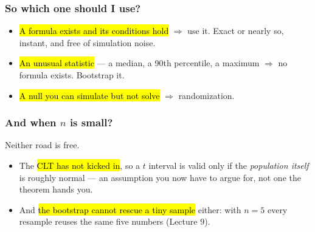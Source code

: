 \documentclass[slidestop,compress,mathserif]{beamer}
\begin{document}
\begin{frame}
\frametitle{So which one should I use?}

\begin{itemize}
\item \hl{A formula exists and its conditions hold} $\Rightarrow$ use it. Exact or nearly so, instant, and free of simulation noise.
\item \hl{An unusual statistic} --- a median, a 90th percentile, a maximum $\Rightarrow$ no formula exists. Bootstrap it.
\item \hl{A null you can simulate but not solve} $\Rightarrow$ randomization.
\end{itemize}

\vspace{0.4em}

\end{frame}

\begin{frame}
\frametitle{And when $n$ is small?}

Neither road is free.

\begin{itemize}
\item The \hl{CLT has not kicked in}, so a $t$ interval is valid only if the \emph{population itself} is roughly normal --- an assumption you now have to argue for, not one the theorem hands you.
\item And \hl{the bootstrap cannot rescue a tiny sample} either: with $n=5$ every resample reuses the same five numbers (Lecture 9).
\end{itemize}

\vspace{0.4em}

\end{frame}

\end{document}
